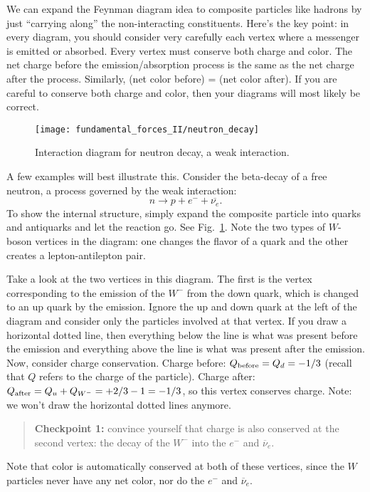 We can expand the Feynman diagram idea to composite particles like
hadrons by just ``carrying along'' the non-interacting constituents.
Here's the key point: in every diagram, you should consider very
carefully each vertex where a messenger is emitted or absorbed.  Every
vertex must conserve both charge and color.  The net charge before the
emission/absorption process is the same as the net charge after the
process.  Similarly, (net color before) = (net color after).  If you
are careful to conserve both charge and color, then your diagrams will
most likely be correct.

\begin{figure}[tbp]
\begin{minipage}{7cm}
\caption{Interaction diagram for neutron decay, a weak interaction.}
\label{fig:neutron_decay}
\end{minipage}
\hfill
\begin{minipage}{4cm}
\texttt{[image: fundamental\_forces\_II/neutron\_decay]}
\end{minipage}
\end{figure}

A few examples will best illustrate this.  Consider the beta-decay of
a free neutron, a process governed by the weak interaction:
\begin{equation}
      n \to p + e^- + \overline{\nu_e}  .
\end{equation}
To show the internal structure, simply expand the composite particle
into quarks and antiquarks and let the reaction go.  See
Fig.~\ref{fig:neutron_decay}.  Note the two types of $W$-boson
vertices in the diagram: one changes the flavor of a quark and the
other creates a lepton-antilepton pair.

Take a look at the two vertices in this diagram.  The first is the
vertex corresponding to the emission of the $W^-$ from the down quark,
which is changed to an up quark by the emission.  Ignore the up and
down quark at the left of the diagram and consider only the particles
involved at that vertex.  If you draw a horizontal dotted line, then
everything below the line is what was present before the emission and
everything above the line is what was present after the emission.
Now, consider charge conservation. Charge before: $Q_{\rm before} =
Q_d = -1/3$ (recall that $Q$ refers to the charge of the particle).
Charge after: $Q_{\rm after} = Q_u + Q_{W^-} = +2/3 - 1 = -1/3$, so
this vertex conserves charge.  Note: we won't draw the horizontal
dotted lines anymore.
\begin{quote}
{\bf Checkpoint 1:} convince yourself that charge is also conserved at
the second vertex: the decay of the $W^-$ into the $e^-$ and $\overline\nu_e$.
\end{quote}
Note that color is automatically conserved at both of these vertices,
since the $W$ particles never have any net color, nor do the $e^-$ and
$\overline\nu_e$.


